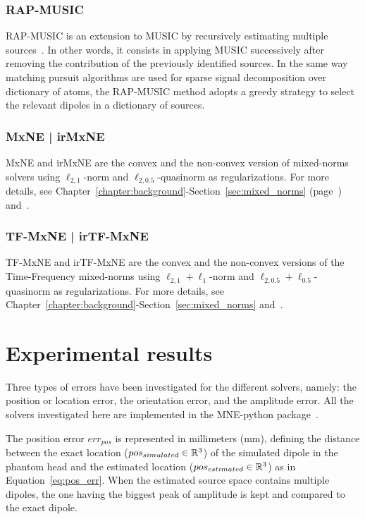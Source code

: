 \subsubsection{RAP-MUSIC}
\Ac{RAP-MUSIC} is an extension to \ac{MUSIC} by recursively estimating multiple sources~\cite{mosher1997source,mosher1999source}. In other words, it consists in applying MUSIC successively after removing the contribution of the previously identified sources. In the same way matching pursuit algorithms are used for sparse signal decomposition over dictionary of atoms, the RAP-MUSIC method adopts a greedy strategy to select the relevant dipoles in a dictionary of sources.

\subsubsection{MxNE | irMxNE}
\Ac{MxNE} and \ac{irMxNE} are the convex and the non-convex version of mixed-norms solvers using $\ell_{2,1}$-norm and $\ell_{2,0.5}$-quasinorm as regularizations. For more details, see Chapter~\ref{chapter:background}-Section~\ref{sec:mixed_norms} (page~\pageref{sec:mixed_norms}) and~\cite{gramfort2012mixed,strohmeier-etal:16}.

\subsubsection{TF-MxNE | irTF-MxNE}
\Ac{TF-MxNE} and \ac{irTF-MxNE} are the convex and the non-convex versions of the Time-Frequency mixed-norms using $\ell_{2,1}+\ell_1$-norm and $\ell_{2,0.5}+\ell_{0.5}$-quasinorm as regularizations. For more details, see Chapter~\ref{chapter:background}-Section~\ref{sec:mixed_norms} and~\cite{TF-MxNE,bekhti2016m}.

\section{Experimental results}
Three types of errors have been investigated for the different solvers, namely: the position or location error, the orientation error, and the amplitude error. All the solvers investigated here are implemented in the MNE-python package~\cite{mne-python,mne}.

The position error $err_{pos}$ is represented in millimeters (mm), defining the distance between the exact location ($pos_{simulated}\in\mathbb{R}^3$) of the simulated dipole in the phantom head and the estimated location ($pos_{estimated}\in\mathbb{R}^3$) as in Equation~\eqref{eq:pos_err}. When the estimated source space contains multiple dipoles, the one having the biggest peak of amplitude is kept and compared to the exact dipole.

